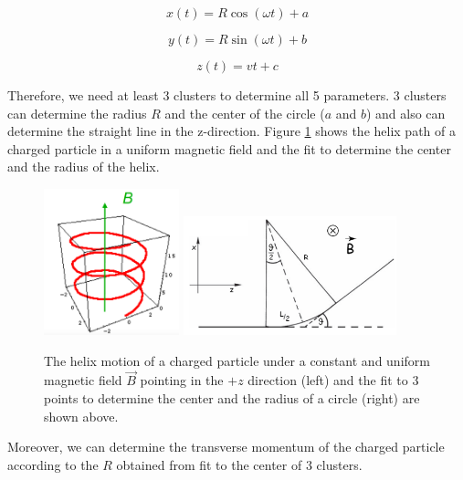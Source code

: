\begin{equation}
x(t) = R \cos(\omega t) + a
\end{equation}

\begin{equation}
y(t) = R \sin(\omega t) + b
\end{equation}

\begin{equation}
z(t) = v t + c
\end{equation}

Therefore, we need at least 3 clusters to determine all 5 parameters. 3 clusters can determine the radius $R$ and the center of the circle ($a$ and $b$) and also can determine the straight line in the z-direction. Figure \ref{HelixAndFit} shows the helix path of a charged particle in a uniform magnetic field and the fit to determine the center and the radius of the helix.


\begin{figure}[hbtp]
\begin{center}
\includegraphics[width=0.35\textwidth]{Figures/Chapter4/Helix.png}
\includegraphics[width=0.55\textwidth]{Figures/Chapter4/FitToCircle.png}
\caption{The helix motion of a charged particle under a constant and uniform magnetic field $\vec{B}$ pointing in the $+z$ direction (left) and the fit to 3 points to determine the center and the radius of a circle (right) are shown above.}
\label{HelixAndFit}
\end{center}
\end{figure} 

Moreover, we can determine the transverse momentum of the charged particle according to the $R$ obtained from fit to the center of 3 clusters.

